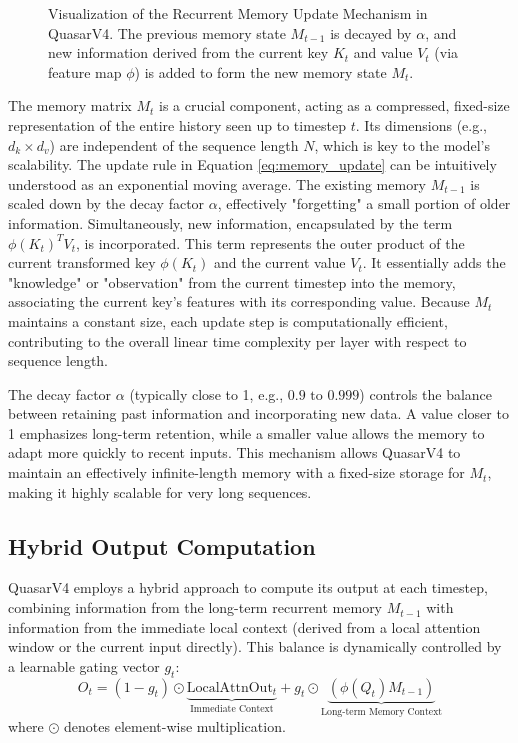 \documentclass{article}
\begin{document}
\begin{figure}[htbp]
{
   }
    \caption{Visualization of the Recurrent Memory Update Mechanism in QuasarV4. The previous memory state $M_{t-1}$ is decayed by $\alpha$, and new information derived from the current key $K_t$ and value $V_t$ (via feature map $\phi$) is added to form the new memory state $M_t$.}
    \label{fig:memory_update_viz}
\end{figure}

The memory matrix $M_t$ is a crucial component, acting as a compressed, fixed-size representation of the entire history seen up to timestep $t$. Its dimensions (e.g., $d_k \times d_v$) are independent of the sequence length $N$, which is key to the model's scalability. The update rule in Equation \ref{eq:memory_update} can be intuitively understood as an exponential moving average. The existing memory $M_{t-1}$ is scaled down by the decay factor $\alpha$, effectively "forgetting" a small portion of older information. Simultaneously, new information, encapsulated by the term $\phi(K_t)^T V_t$, is incorporated. This term represents the outer product of the current transformed key $\phi(K_t)$ and the current value $V_t$. It essentially adds the "knowledge" or "observation" from the current timestep into the memory, associating the current key's features with its corresponding value. Because $M_t$ maintains a constant size, each update step is computationally efficient, contributing to the overall linear time complexity per layer with respect to sequence length.

The decay factor $\alpha$ (typically close to 1, e.g., $0.9 \text{ to } 0.999$) controls the balance between retaining past information and incorporating new data. A value closer to 1 emphasizes long-term retention, while a smaller value allows the memory to adapt more quickly to recent inputs. This mechanism allows QuasarV4 to maintain an effectively infinite-length memory with a fixed-size storage for $M_t$, making it highly scalable for very long sequences.

\subsection{Hybrid Output Computation}
\label{sec:hybrid_output}
QuasarV4 employs a hybrid approach to compute its output at each timestep, combining information from the long-term recurrent memory $M_{t-1}$ with information from the immediate local context (derived from a local attention window or the current input directly). This balance is dynamically controlled by a learnable gating vector $g_t$:
\begin{equation}
O_t = (1 - g_t) \odot \underbrace{\text{LocalAttnOut}_t}_{\text{Immediate Context}} + g_t \odot \underbrace{(\phi(Q_t) M_{t-1})}_{\text{Long-term Memory Context}}
\label{eq:hybrid_output}
\end{equation}
where $\odot$ denotes element-wise multiplication.
\end{document}
